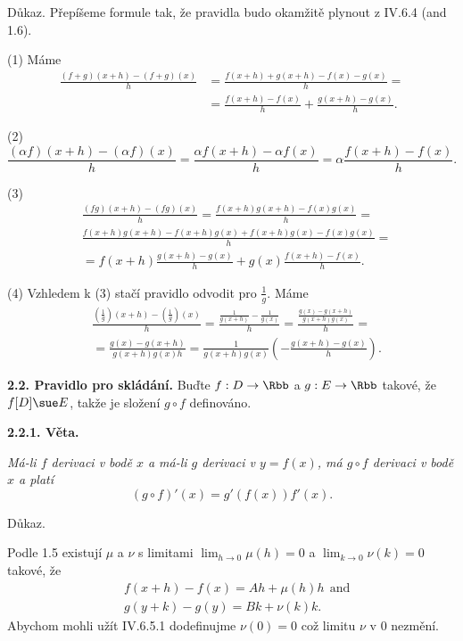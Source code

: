 \documentclass[12pt]{article}
\begin{document}
{{ Důkaz.} Přepíšeme formule tak, že pravidla budo okamžitě plynout z IV.6.4 (and 1.6).
 
 \smallskip
 
 (1) Máme
 $$
 \begin{aligned}
 \frac{(f+g)(x+h)-(f+g)(x)}{h}&=\frac{f(x+h)+g(x+h)-f(x)-g(x)}{h}=\\
 &=\frac{f(x+h)-f(x)}{h}+\frac{g(x+h)-g(x)}{h}.
 \end{aligned}
 $$
 
 \smallskip
 
 (2)
 $$
 \frac{(\alpha f)(x+h)-(\alpha f)(x)}{h}=\frac{\alpha f(x+h)-\alpha f(x)}{h}
=\alpha\frac{f(x+h)-f(x)}{h}.
$$

\smallskip

(3)
$$
\begin{aligned}
&\frac{(fg)(x+h)-(fg)(x)}{h}=\frac{f(x+h)g(x+h)-f(x)g(x)}{h}=\\
&\frac{f(x+h)g(x+h)-f(x+h)g(x) +f(x+h)g(x)-f(x)g(x)}{h}=\\
&=f(x+h)\frac{g(x+h)-g(x)}{h}+g(x)\frac{f(x+h)-f(x)}{h}.
\end{aligned}
$$ 

\smallskip

(4) Vzhledem k (3) stačí pravidlo odvodit pro $\frac{1}{g}$. Máme
$$
\begin{aligned}
&\frac{(\frac{1}{g})(x+h)-(\frac{1}{g})(x)}{h}=
\frac{\frac{1}{g(x+h)}-\frac{1}{g(x)}}{h}=
\frac{\frac{g(x)-g(x+h)}{g(x+h)g(x)}}{h}=\\
&=\frac{g(x)-g(x+h)}{g(x+h)g(x)h}=
\frac{1}{g(x+h)g(x)}\left(-\frac{g(x+h)-g(x)}{h}\right).
\end{aligned}
$$
\sq

\bigskip


{\bf 2.2. Pravidlo pro skládání.} Buďte $f:D\to\Rbb$ a $g:E\to\Rbb$ takové, že $f[D]\sue E$, takže je složení  $g\circ f$  definováno.

\smallskip

{\bf 2.2.1. Věta.} {\em Má-li $f$ derivaci v bodě $x$ a má-li $g$ derivaci v $y=f(x)$, má $g\circ f$
 derivaci v bodě $x$ 
a platí
$$
(g\circ f)'(x)=g'(f(x))f'(x).
$$

Důkaz.} Podle 1.5 existují $\mu$ a $\nu$ s limitami $\lim_{h\to 0}\mu(h)=0$ a 
$\lim_{k\to 0}\nu(k)=0$ takové, že
$$
\begin{aligned}
&f(x+h)-f(x)=Ah+\mu(h)h\ \ \text{and}\\
&g(y+k)-g(y)=Bk+\nu(k)k.
\end{aligned}
$$
Abychom mohli užít IV.6.5.1 dodefinujme $\nu(0)=0$ což limitu $\nu$ v 0 nezmění.

}
\end{document}
